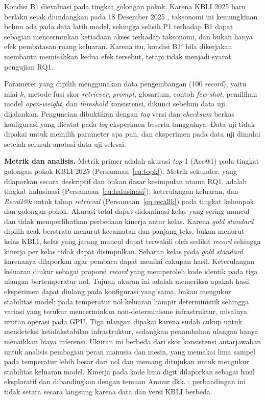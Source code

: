 Kondisi B1 dievaluasi pada tingkat golongan pokok. Karena KBLI 2025 baru berlaku sejak diundangkan pada 18 Desember 2025 \cite{bps2025perban7}, taksonomi ini kemungkinan belum ada pada data latih model, sehingga selisih P1 terhadap B1 dapat sebagian mencerminkan ketiadaan akses terhadap taksonomi, dan bukan hanya efek pembatasan ruang keluaran. Karena itu, kondisi B1$'$ bila dikerjakan membantu memisahkan kedua efek tersebut, tetapi tidak menjadi syarat pengujian RQ1.

Parameter yang dipilih menggunakan data pengembangan (100 \textit{record}), yaitu nilai $k$, metode fusi skor \textit{retriever}, \textit{prompt}, glosarium, contoh \textit{few-shot}, pemilihan model \textit{open-weight}, dan \textit{threshold} konsistensi, dikunci sebelum data uji dijalankan. Penguncian dibuktikan dengan \textit{tag} versi dan \textit{checksum} berkas konfigurasi yang dicatat pada \textit{log} eksperimen beserta tanggalnya. Data uji tidak dipakai untuk memilih parameter apa pun, dan eksperimen pada data uji dimulai setelah seluruh anotasi data uji selesai.

\textbf{Metrik dan analisis.} Metrik primer adalah akurasi \textit{top}-1 (Acc@1) pada tingkat golongan pokok KBLI 2025 (Persamaan~\eqref{eq:topk}). Metrik sekunder, yang dilaporkan secara deskriptif dan bukan dasar kesimpulan utama RQ1, adalah tingkat halusinasi (Persamaan~\eqref{eq:halusinasi}), keterulangan keluaran, dan \textit{Recall@k} untuk tahap \textit{retrieval} (Persamaan~\eqref{eq:recallk}) pada tingkat kelompok dan golongan pokok. Akurasi total dapat didominasi kelas yang sering muncul dan tidak memperlihatkan perbedaan kinerja antar kelas. Karena \textit{gold standard} dipilih acak berstrata menurut kecamatan dan panjang teks, bukan menurut kelas KBLI, kelas yang jarang muncul dapat terwakili oleh sedikit \textit{record} sehingga kinerja per kelas tidak dapat disimpulkan. Sebaran kelas pada \textit{gold standard} karenanya dilaporkan agar pembaca dapat menilai cakupan hasil. Keterulangan keluaran diukur sebagai proporsi \textit{record} yang memperoleh kode identik pada tiga ulangan bertemperatur nol. Tujuan ukuran ini adalah memeriksa apakah hasil eksperimen dapat diulang pada konfigurasi yang sama, bukan mengukur stabilitas model; pada temperatur nol keluaran hampir deterministik sehingga variasi yang terukur mencerminkan non-determinisme infrastruktur, misalnya urutan operasi pada GPU. Tiga ulangan dipakai karena sudah cukup untuk mendeteksi ketidakstabilan infrastruktur, sedangkan penambahan ulangan hanya menaikkan biaya inferensi. Ukuran ini berbeda dari skor konsistensi antarjawaban untuk analisis pembagian peran manusia dan mesin, yang memakai lima sampel pada temperatur lebih besar dari nol dan memang ditujukan untuk mengukur stabilitas keluaran model. Kinerja pada kode lima digit dilaporkan sebagai hasil eksploratif dan dibandingkan dengan temuan Amnur dkk. \cite{amnur2025kbli}; perbandingan ini tidak setara secara langsung karena data dan versi KBLI berbeda.


